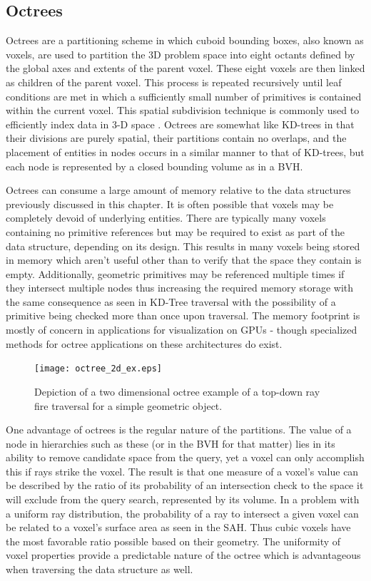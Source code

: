 \subsection{Octrees}%
\label{subsec:octree}

Octrees are a partitioning scheme in which cuboid bounding boxes, also
known as voxels, are used to partition the 3D problem space into eight
octants defined by the global axes and extents of the parent voxel. These eight
voxels are then linked as children of the parent voxel. This process is repeated
recursively until leaf conditions are met in which a sufficiently small number
of primitives is contained within the current voxel. This spatial subdivision
technique is commonly used to efficiently index data in 3-D space
\cite{Glassner_1989}. Octrees are somewhat like KD-trees in that their divisions
are purely spatial, their partitions contain no overlaps, and the placement of entities
in nodes occurs in a similar manner to that of KD-trees, but each node is
represented by a closed bounding volume as in a BVH.

Octrees can consume a large amount of memory relative to the data structures
previously discussed in this chapter. It is often possible that voxels may be
completely devoid of underlying entities. There are typically many voxels
containing no primitive references but may be required to exist as part of the
data structure, depending on its design. This results in many voxels being
stored in memory which aren't useful other than to verify that the space they
contain is empty. Additionally, geometric primitives may be referenced multiple
times if they intersect multiple nodes thus increasing the required memory
storage with the same consequence as seen in KD-Tree traversal with the
possibility of a primitive being checked more than once upon traversal. The
memory footprint is mostly of concern in applications for visualization on GPUs
- though specialized methods for octree applications on these architectures do
exist.

\begin{figure}[H]
  \centering
  \texttt{[image: octree\_2d\_ex.eps]}
  \caption[A 2D octree example.]{Depiction of a two dimensional octree example of a top-down ray fire traversal for a simple geometric object.}
  \label{fig:2D_octree}
\end{figure}

One advantage of octrees is the regular nature of the partitions. The value of a
node in hierarchies such as these (or in the BVH for that matter) lies in its
ability to remove candidate space from the query, yet a voxel can only
accomplish this if rays strike the voxel. The result is that one measure of a
voxel's value can be described by the ratio of its probability of an
intersection check to the space it will exclude from the query search,
represented by its volume. In a problem with a uniform ray distribution, the
probability of a ray to intersect a given voxel can be related to a voxel's
surface area as seen in the SAH. Thus cubic voxels have the most favorable ratio
possible based on their geometry. The uniformity of voxel properties provide a
predictable nature of the octree which is advantageous when traversing the data
structure as well.

